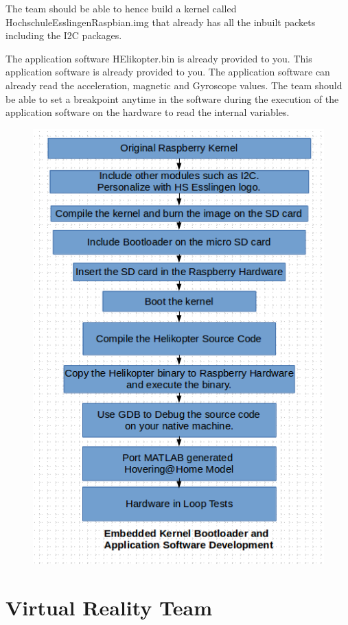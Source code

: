 \documentclass[a4paper,11pt]{article}
\begin{document}
The team should be able to hence build a kernel called HochschuleEsslingenRaspbian.img that already has all the inbuilt packets including the I2C packages.

The application software HElikopter.bin is already provided to you. This application software is already provided to you. The application software can already read the acceleration, magnetic and Gyroscope values. The team should be able to set a breakpoint anytime in the software during the execution of the application software on the hardware to read the internal variables.

\begin{figure}[ht]
\centering
\includegraphics[scale=0.4]{pics/Embedded.png}
\end{figure}

\pagebreak
\section{Virtual Reality Team}
\end{document}
